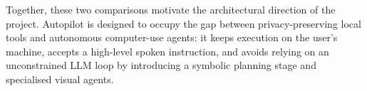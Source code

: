 Together, these two comparisons motivate the architectural direction of the project. Autopilot is designed to occupy the gap between privacy-preserving local tools and autonomous computer-use agents: it keeps execution on the user's machine, accepts a high-level spoken instruction, and avoids relying on an unconstrained LLM loop by introducing a symbolic planning stage and specialised visual agents.
